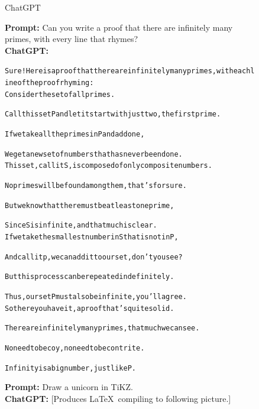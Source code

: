 \begin{figure}

\begin{AIbox}{ChatGPT}
\parbox[t]{0.6\linewidth}{
{\small {\bf Prompt:} Can you write a proof that there are infinitely many primes, with every line that rhymes?}\\

{\small\bf ChatGPT:} \scriptsize \begin{alltt}
Sure! Here is a proof that there are infinitely many primes, with each line of the proof rhyming:
\\

Consider the set of all primes.

Call this set P and let it start with just two, the first prime.

If we take all the primes in P and add one,

We get a new set of numbers that has never been done.
\\

This set, call it S, is composed of only composite numbers.

No primes will be found among them, that's for sure.

But we know that there must be at least one prime,

Since S is infinite, and that much is clear.
\\

If we take the smallest number in S that is not in P,

And call it p, we can add it to our set, don't you see?

But this process can be repeated indefinitely.

Thus, our set P must also be infinite, you'll agree.
\\

So there you have it, a proof that's quite solid.

There are infinitely many primes, that much we can see.

No need to be coy, no need to be contrite.

Infinity is a big number, just like P.
\end{alltt}}
\hspace{0.2in}
\parbox[t]{0.35\linewidth}{\small {\bf Prompt:} Draw a unicorn in TiKZ.\\

{\bf ChatGPT:} {\scriptsize [Produces \LaTeX\ compiling to following picture.]} \\

}
\end{AIbox}
\end{figure}
